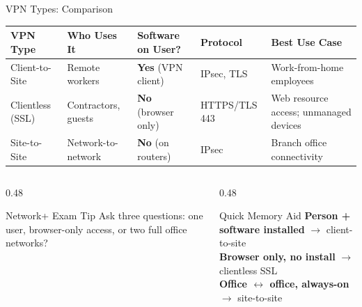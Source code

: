 \documentclass[aspectratio=169]{beamer}  %
\begin{document}
\begin{frame}[t]{VPN Types: Comparison}
    \begin{center}
        \footnotesize
        \begin{tabular}{l l l l p{3.0cm}}
            \toprule
            \textbf{VPN Type} & \textbf{Who Uses It} & \textbf{Software on User?} & \textbf{Protocol} & \textbf{Best Use Case} \\
            \midrule
            \rowcolor{ipblue!15}
            Client-to-Site  & Remote workers   & \textbf{Yes} (VPN client)   & IPsec, TLS & Work-from-home employees \\
            \rowcolor{networkgreen!15}
            Clientless (SSL) & Contractors, guests & \textbf{No} (browser only) & HTTPS/TLS 443 & Web resource access; unmanaged devices \\
            \rowcolor{aborange!15}
            Site-to-Site    & Network-to-network & \textbf{No} (on routers) & IPsec & Branch office connectivity \\
            \bottomrule
        \end{tabular}
    \end{center}
    \vspace{0.5em}
    \begin{columns}[T]
        \begin{column}{0.48\textwidth}
            \begin{alertblock}{Network+ Exam Tip}
                \footnotesize Ask three questions: one user, browser-only access, or two full office networks?
            \end{alertblock}
        \end{column}
        \begin{column}{0.48\textwidth}
            \begin{exampleblock}{Quick Memory Aid}
                \footnotesize \textbf{Person + software installed} $\rightarrow$ client-to-site \\
                \textbf{Browser only, no install} $\rightarrow$ clientless SSL \\
                \textbf{Office $\leftrightarrow$ office, always-on} $\rightarrow$ site-to-site
            \end{exampleblock}
        \end{column}
    \end{columns}
\end{frame}
\end{document}

